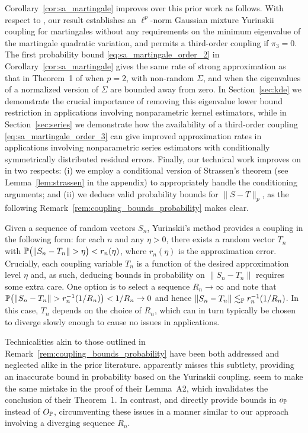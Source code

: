 Corollary~\ref{cor:sa_martingale} improves over this prior work as follows.
With respect to \citet{li2020uniform}, our result establishes an $\ell^p$-norm
Gaussian mixture Yurinskii coupling for martingales without any requirements on
the minimum eigenvalue of the martingale quadratic variation, and permits a
third-order coupling if $\pi_3=0$. The first probability bound
\eqref{eq:sa_martingale_order_2} in Corollary~\ref{cor:sa_martingale} gives the
same rate of strong approximation as that in Theorem~1 of \citet{li2020uniform}
when $p=2$, with non-random $\Sigma$, and when the eigenvalues of a normalized
version of $\Sigma$ are bounded away from zero. In Section~\ref{sec:kde} we
demonstrate the crucial importance of removing this eigenvalue lower bound
restriction in applications involving nonparametric kernel estimators, while in
Section~\ref{sec:series} we demonstrate how the availability of a third-order
coupling \eqref{eq:sa_martingale_order_3} can give improved approximation rates
in applications involving nonparametric series estimators with conditionally
symmetrically distributed residual errors. Finally, our technical work improves
on \citet{li2020uniform} in two respects: (i) we employ a conditional version
of Strassen's theorem (see Lemma~\ref{lem:strassen} in the appendix)
to appropriately handle the conditioning arguments; and (ii) we deduce valid
probability bounds for $\|S-T\|_p$, as the following
Remark~\ref{rem:coupling_bounds_probability} makes clear.

\begin{remark}
  \label{rem:coupling_bounds_probability}
  Given a sequence of random vectors $S_n$, Yurinskii's method provides a
  coupling in the following form: for each $n$ and any $\eta > 0$, there exists
  a random vector $T_n$ with $\P\big(\|S_n - T_n\| > \eta\big) < r_n(\eta)$,
  where $r_n(\eta)$ is the approximation error. Crucially, each coupling
  variable $T_n$ is a function of the desired approximation level $\eta$ and,
  as such, deducing bounds in probability on $\|S_n - T_n\|$ requires some
  extra care. One option is to select a sequence $R_n \to \infty$ and note that
  $\P\big(\|S_n - T_n\| > r_n^{-1}(1 / R_n)\big) < 1 / R_n \to 0$ and hence
  $\|S_n - T_n\| \lesssim_\P r_n^{-1}(1 / R_n)$. In this case, $T_n$ depends on
  the choice of $R_n$, which can in turn typically be chosen to diverge slowly
  enough to cause no issues in applications.
\end{remark}

Technicalities akin to those outlined in
Remark~\ref{rem:coupling_bounds_probability} have been both addressed and
neglected alike in the prior literature. \citet[Chapter 10.4, Example
  16]{pollard2002user} apparently misses this subtlety, providing an
inaccurate bound in probability based on the Yurinskii coupling.
\citet{li2020uniform} seem to make the same mistake in the proof of their
Lemma~A2, which invalidates the conclusion of their Theorem~1. In contrast,
\citet{belloni2015some} and \citet{belloni2019conditional} directly provide
bounds in $o_\P$ instead of $O_\P$, circumventing these issues in a manner
similar to our approach involving a diverging sequence $R_n$.

